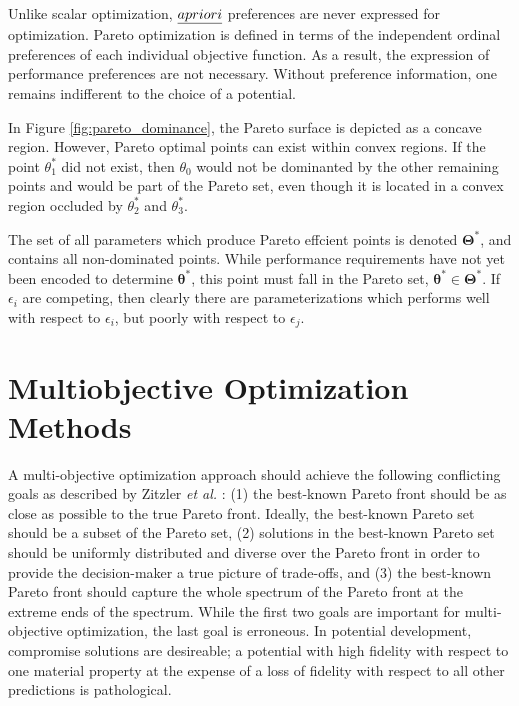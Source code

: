 Unlike scalar optimization, $\emph{a priori}$ preferences are never expressed for optimization.  Pareto optimization is defined in terms of the independent ordinal preferences of each individual objective function.  As a result, the expression of performance preferences are not necessary.  Without preference information, one remains indifferent to the choice of a potential.

In Figure \ref{fig:pareto_dominance}, the Pareto surface is depicted as a concave region.  However, Pareto optimal points can exist within convex regions.  If the point $\theta_1^*$ did not exist, then $\theta_0$ would not be dominanted by the other remaining points and would be part of the Pareto set, even though it is located in a convex region occluded by $\theta_2^*$ and $\theta_3^*$.

The set of all parameters which produce Pareto effcient points is denoted $\bm{\Theta}^*$, and contains all non-dominated points.  While performance requirements have not yet been encoded to determine $\bm{\theta}^*$, this point must fall in the Pareto set, $\bm{\theta}^* \in \bm{\Theta}^*$.  If $\epsilon_i$ are competing, then clearly there are parameterizations which performs well with respect to $\epsilon_i$, but poorly with respect to $\epsilon_j$.

\section{Multiobjective Optimization Methods}
A multi-objective optimization approach should achieve the following conflicting goals as described by Zitzler \emph{et al.} \cite{zitzler2000_moo_evolve}: (1) the best-known Pareto front should be as close as possible to the true Pareto front.  Ideally, the best-known Pareto set should be a subset of the Pareto set, (2) solutions in the best-known Pareto set should be uniformly distributed and diverse over the Pareto front in order to provide the decision-maker a true picture of trade-offs, and (3) the best-known Pareto front should capture the whole spectrum of the Pareto front at the extreme ends of the spectrum.  While the first two goals are important for multi-objective optimization, the last goal is erroneous.  In potential development, compromise solutions are desireable; a potential with high fidelity with respect to one material property at the expense of a loss of fidelity with respect to all other predictions is pathological.

